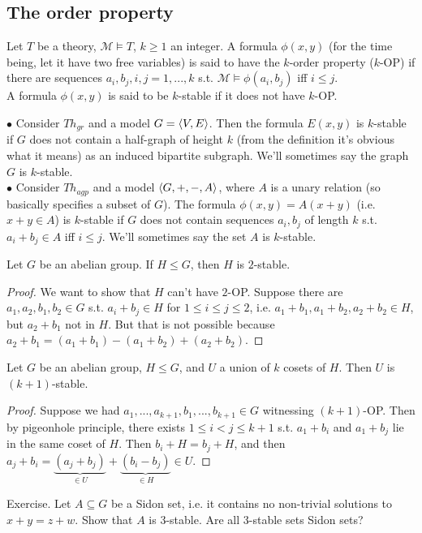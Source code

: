 \documentclass[a4paper]{article}
\begin{document}
\subsection{The order property}

\begin{defi}
Let $T$ be a theory, $\mathcal{M} \vDash T$, $k \geq 1$ an integer. A formula $\phi(x,y)$ (for the time being, let it have two free variables) is said to have the $k$-order property ($k$-OP) if there are sequences $a_i,b_j,i,j=1,...,k$ s.t. $\mathcal{M} \vDash \phi(a_i,b_j)$ iff $i \leq j$.\\
A formula $\phi(x,y)$ is said to be $k$-stable if it does not have $k$-OP.
\end{defi}

\begin{eg}
$\bullet$ Consider $Th_{gr}$ and a model $G=\langle V,E\rangle$. Then the formula $E(x,y)$ is $k$-stable if $G$ does not contain a half-graph of height $k$ (from the definition it's obvious what it means) as an induced bipartite subgraph. We'll sometimes say the graph $G$ is $k$-stable.\\
$\bullet$ Consider $Th_{agp}$ and a model $\langle G,+,-,A\rangle$, where $A$ is a unary relation (so basically specifies a subset of $G$). The formula $\phi(x,y)=A(x+y)$ (i.e. $x+y \in A$) is $k$-stable if $G$ does not contain sequences $a_i,b_j$ of length $k$ s.t. $a_i+b_j \in A$ iff $i \leq j$. We'll sometimes say the set $A$ is $k$-stable.\\
\end{eg}

\begin{lemma}
Let $G$ be an abelian group. If $H \leq G$, then $H$ is $2$-stable.
\begin{proof}
We want to show that $H$ can't have $2$-OP. Suppose there are $a_1,a_2,b_1,b_2 \in G$ s.t. $a_i+b_j \in H$ for $1 \leq i \leq j \leq 2$, i.e. $a_1+b_1,a_1+b_2,a_2+b_2 \in H$, but $a_2+b_1$ not in $H$. But that is not possible because $a_2+b_1 = (a_1+b_1)-(a_1+b_2)+(a_2+b_2)$.
\end{proof}
\end{lemma}

\begin{lemma}
Let $G$ be an abelian group, $H \leq G$, and $U$ a union of $k$ cosets of $H$. Then $U$ is $(k+1)$-stable.
\begin{proof}
Suppose we had $a_1,...,a_{k+1},b_1,...,b_{k+1} \in G$ witnessing $(k+1)$-OP. Then by pigeonhole principle, there exists $1 \leq i < j \leq k+1$ s.t. $a_1+b_i$ and $a_1+b_j$ lie in the same coset of $H$. Then $b_i+H = b_j+H$, and then $a_j+b_i =\underbrace{(a_j+b_j)}_{\in U} + \underbrace{(b_i-b_j)}_{\in H} \in U$.
\end{proof}
\end{lemma}

Exercise. Let $A \subseteq G$ be a Sidon set, i.e. it contains no non-trivial solutions to $x+y=z+w$. Show that $A$ is 3-stable. Are all 3-stable sets Sidon sets?
\end{document}
